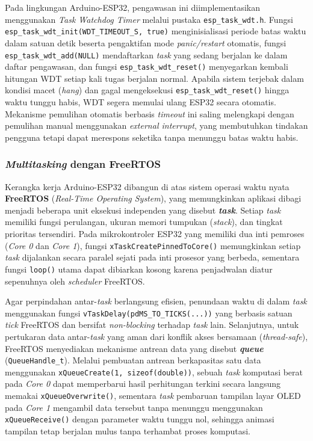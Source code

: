 Pada lingkungan Arduino-ESP32, pengawasan ini diimplementasikan menggunakan \textit{Task Watchdog Timer} melalui pustaka \texttt{esp\_task\_wdt.h}. Fungsi \texttt{esp\_task\_wdt\_init(WDT\_TIMEOUT\_S, true)} menginisialisasi periode batas waktu dalam satuan detik beserta pengaktifan mode \textit{panic/restart} otomatis, fungsi \texttt{esp\_task\_wdt\_add(NULL)} mendaftarkan \textit{task} yang sedang berjalan ke dalam daftar pengawasan, dan fungsi \texttt{esp\_task\_wdt\_reset()} menyegarkan kembali hitungan WDT setiap kali tugas berjalan normal. Apabila sistem terjebak dalam kondisi macet (\textit{hang}) dan gagal mengeksekusi \texttt{esp\_task\_wdt\_reset()} hingga waktu tunggu habis, WDT segera memulai ulang ESP32 secara otomatis. Mekanisme pemulihan otomatis berbasis \textit{timeout} ini saling melengkapi dengan pemulihan manual menggunakan \textit{external interrupt}, yang membutuhkan tindakan pengguna tetapi dapat merespons seketika tanpa menunggu batas waktu habis.

\subsubsection{\textit{Multitasking} dengan FreeRTOS}
Kerangka kerja Arduino-ESP32 dibangun di atas sistem operasi waktu nyata \textbf{FreeRTOS} (\textit{Real-Time Operating System}), yang memungkinkan aplikasi dibagi menjadi beberapa unit eksekusi independen yang disebut \textbf{\textit{task}}. Setiap \textit{task} memiliki fungsi perulangan, ukuran memori tumpukan (\textit{stack}), dan tingkat prioritas tersendiri. Pada mikrokontroler ESP32 yang memiliki dua inti pemroses (\textit{Core 0} dan \textit{Core 1}), fungsi \texttt{xTaskCreatePinnedToCore()} memungkinkan setiap \textit{task} dijalankan secara paralel sejati pada inti prosesor yang berbeda, sementara fungsi \texttt{loop()} utama dapat dibiarkan kosong karena penjadwalan diatur sepenuhnya oleh \textit{scheduler} FreeRTOS.

Agar perpindahan antar-\textit{task} berlangsung efisien, penundaan waktu di dalam \textit{task} menggunakan fungsi \texttt{vTaskDelay(pdMS\_TO\_TICKS(...))} yang berbasis satuan \textit{tick} FreeRTOS dan bersifat \textit{non-blocking} terhadap \textit{task} lain. Selanjutnya, untuk pertukaran data antar-\textit{task} yang aman dari konflik akses bersamaan (\textit{thread-safe}), FreeRTOS menyediakan mekanisme antrean data yang disebut \textbf{\textit{queue}} (\texttt{QueueHandle\_t}). Melalui pembuatan antrean berkapasitas satu data menggunakan \texttt{xQueueCreate(1, sizeof(double))}, sebuah \textit{task} komputasi berat pada \textit{Core 0} dapat memperbarui hasil perhitungan terkini secara langsung memakai \texttt{xQueueOverwrite()}, sementara \textit{task} pembaruan tampilan layar OLED pada \textit{Core 1} mengambil data tersebut tanpa menunggu menggunakan \texttt{xQueueReceive()} dengan parameter waktu tunggu nol, sehingga animasi tampilan tetap berjalan mulus tanpa terhambat proses komputasi.

